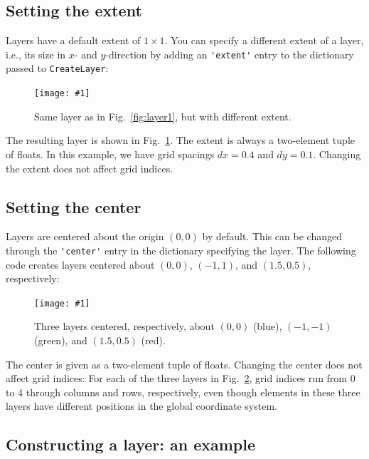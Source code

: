 \documentclass[a4paper,12pt]{report}
\newcommand{\scriptfig}[4]{%
\begin{figure}
\centerline{\texttt{[image: \#1]}}
\caption[#3]{#4}
\label{fig:#1}
\end{figure}%
}
\begin{document}
\subsection{Setting the extent}\label{sec:setextent}

Layers have a default extent of $1\times 1$.
You can specify a different extent of a layer, i.e., its size in $x$- and
$y$-direction by adding an \lstinline!'extent'! entry to the
dictionary passed to \lstinline!CreateLayer!:
%

\scriptfig{layer2}{0.8}{Layer with non-standard extent}%
{Same layer as in Fig.~\ref{fig:layer1}, but with different extent.}
%
The resulting layer is shown in Fig.~\ref{fig:layer2}. The extent is
always a two-element tuple of floats. In this example, we have grid
spacings $dx=0.4$ and $dy=0.1$. Changing the extent does not affect
grid indices.

\subsection{Setting the center}\label{sec:setcenter}

Layers are centered about the origin $(0,0)$ by default. This can be
changed through the \lstinline!'center'! entry in the dictionary
specifying the layer. The following code creates layers centered about
$(0,0)$, $(-1,1)$, and $(1.5,0.5)$, respectively:
%

\scriptfig{layer3}{0.8}{Layers with different centers}%
{Three layers centered, respectively, about $(0,0)$ (blue), $(-1,-1)$
  (green), and $(1.5,0.5)$ (red).}
%
The center is given as a two-element tuple of floats.
Changing the center does not affect grid indices: For each of the
three layers in Fig.~\ref{fig:layer3}, grid indices run from 0 to 4
through columns and rows, respectively, even though elements in these
three layers have different positions in the global coordinate system.

\subsection{Constructing a layer: an example}\label{sec:fixedlayerexample}
\end{document}

